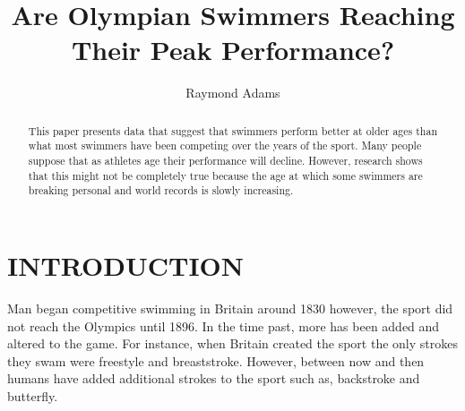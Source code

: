 \documentclass[letterpaper, 10 pt, conference]{ieeeconf}  %
\title{\LARGE \bf
Are Olympian Swimmers Reaching Their Peak Performance?
}
\author{Raymond Adams}
\begin{document}
\maketitle
\thispagestyle{empty}
\pagestyle{empty}


\begin{abstract}

This paper presents data that suggest that swimmers perform better at older ages than what most swimmers have been competing over the years of the sport. Many people suppose that as athletes age their performance will decline. However, research shows that this might not be completely true because the age at which some swimmers are breaking personal and world records is slowly increasing.  

\end{abstract}


\section{INTRODUCTION}

Man began competitive swimming in Britain around 1830 however, the sport did not reach the Olympics until 1896. In the time past, more has been added and altered to the game. For instance, when Britain created the sport the only strokes they swam were freestyle and breaststroke. However, between now and then humans have added additional strokes to the sport such as, backstroke and butterfly.
\end{document}
